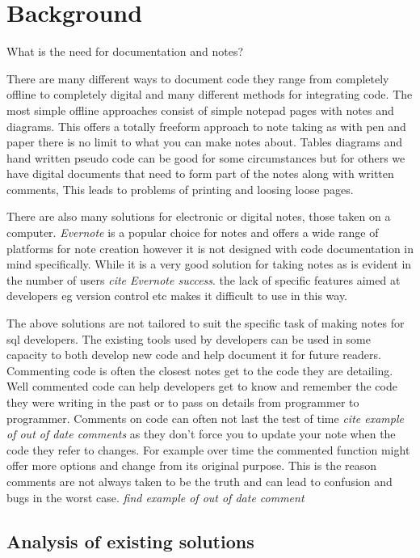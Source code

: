 \chapter{Background}\label{background}

What is the need for documentation and notes?

There are many different ways to document code they range from
completely offline to completely digital and many different methods for
integrating code. The most simple offline approaches consist of simple
notepad pages with notes and diagrams. This offers a totally freeform
approach to note taking as with pen and paper there is no limit to what
you can make notes about. Tables diagrams and hand written pseudo code
can be good for some circumstances but for others we have digital
documents that need to form part of the notes along with written
comments, This leads to problems of printing and loosing loose pages.

There are also many solutions for electronic or digital notes, those
taken on a computer. \textit{Evernote}\cite{Evernote} is a popular choice for notes and
offers a wide range of platforms for note creation however it is not
designed with code documentation in mind specifically. While it is a
very good solution for taking notes as is evident in the number of users
\emph{cite Evernote success}. the lack of specific features aimed at
developers eg version control etc makes it difficult to use in this way.

The above solutions are not tailored to suit the specific task of making
notes for sql developers. The existing tools used by developers can be
used in some capacity to both develop new code and help document it for
future readers. Commenting code is often the closest notes get to the
code they are detailing. Well commented code can help developers get to
know and remember the code they were writing in the past or to pass on
details from programmer to programmer. Comments on code can often not
last the test of time \emph{cite example of out of date comments} as
they don't force you to update your note when the code they refer to
changes. For example over time the commented function might offer more
options and change from its original purpose. This is the reason
comments are not always taken to be the truth and can lead to confusion
and bugs in the worst case. \emph{find example of out of date comment}

\section{Analysis of existing
solutions}\label{analysis-of-existing-solutions}

